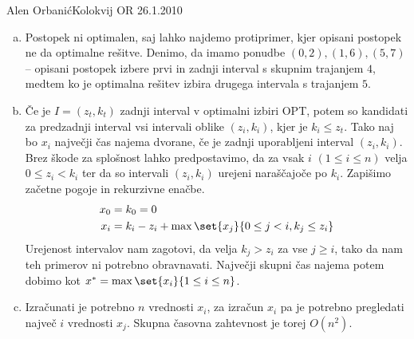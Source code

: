 \begin{naloga}{Alen Orbanić}{Kolokvij OR 26.1.2010}
\begin{odgovor}
\begin{enumerate}[(a)]
\item Postopek ni optimalen,
saj lahko najdemo protiprimer, kjer opisani postopek ne da optimalne rešitve.
Denimo, da imamo ponudbe $(0, 2), (1, 6), (5, 7)$
-- opisani postopek izbere prvi in zadnji interval s skupnim trajanjem $4$,
medtem ko je optimalna rešitev izbira drugega intervala s trajanjem $5$.

\item Če je $I = (z_t, k_t)$ zadnji interval v optimalni izbiri OPT,
potem so kandidati za predzadnji interval vsi intervali oblike $(z_i, k_i)$,
kjer je $k_i \le z_t$.
Tako naj bo $x_i$ največji čas najema dvorane,
če je zadnji uporabljeni interval $(z_i, k_i)$.
Brez škode za splošnost lahko predpostavimo,
da za vsak $i$ $(1 \le i \le n)$ velja $0 \le z_i < k_i$
ter da so intervali $(z_i, k_i)$ urejeni naraščajoče po $k_i$.
Zapišimo začetne pogoje in rekurzivne enačbe.
\begin{align*}
x_0 &= k_0 = 0 \\
x_i &= k_i - z_i + \max\set{x_j}{0 \le j < i, k_j \le z_i}
\end{align*}
Urejenost intervalov nam zagotovi,
da velja $k_j > z_i$ za vse $j \ge i$,
tako da nam teh primerov ni potrebno obravnavati.
Največji skupni čas najema potem dobimo kot
$x^* = \max\set{x_i}{1 \le i \le n}$.

\item Izračunati je potrebno $n$ vrednosti $x_i$,
za izračun $x_i$ pa je potrebno pregledati največ $i$ vrednosti $x_j$.
Skupna časovna zahtevnost je torej $O(n^2)$.


\end{enumerate}
\end{odgovor}
\end{naloga}
